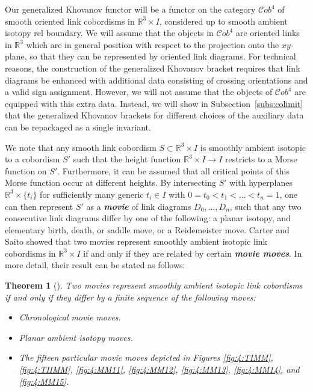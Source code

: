 \documentclass[12pt]{amsart}
\theoremstyle{definition}
\theoremstyle{plain}
\newtheorem{theorem}{Theorem}
\newcommand{\defw}[1]{{\bf{\textit{#1}}}}
\newcommand{\cobIV}{\mathcal{C}ob^4}
\begin{document}
Our generalized Khovanov functor will be a functor on the category $\cobIV$ of smooth
oriented link cobordisms in $\mathbb{R}^3\times I$, considered up to smooth ambient isotopy rel boundary. 
We will assume that the objects in $\cobIV$ are oriented links in $\mathbb{R}^3$ which are in general position
with respect to the projection onto the $xy$-plane, so that they can
be represented by oriented link diagrams. For technical reasons,
the construction of the generalized Khovanov bracket requires that link diagrams be enhanced
with additional data consisting of crossing orientations and a valid sign assignment. However,
we will not assume that the objects of
$\cobIV$ are equipped with this extra data. Instead, we will show in Subsection~\ref{subs:colimit}
that the generalized Khovanov brackets for different choices of the auxiliary data
can be repackaged as a single invariant.

We note that any smooth link cobordism $S\subset\mathbb{R}^3\times I$ is smoothly
ambient isotopic to a cobordism $S'$ such that the height function $\mathbb{R}^3\times I\rightarrow I$
restricts to a Morse function on $S'$. Furthermore, it can be assumed that all critical
points of this Morse function occur at different heights. By intersecting $S'$
with hyperplanes $\mathbb{R}^3\times\{t_i\}$ for sufficiently many generic $t_i\in I$ with $0=t_0<t_1<\ldots<t_n=1$,
one can then represent $S'$ as a \defw{movie} of link diagrams $D_0,\ldots,D_n$, such that any two
consecutive link diagrams differ by one of the following: a planar isotopy, and elementary birth, death, or saddle move,
or a Reidemeister move.
Carter and Saito \cite{CS1991,CS1993} showed that two movies represent smoothly ambient
isotopic link cobordisms in $\mathbb{R}^3\times I$ if and only if they are related by certain \defw{movie moves}. In more detail,
their result can be stated as follows:

\begin{theorem}[\cite{CS1993}]\label{thm:CS}
	Two movies represent smoothly ambient isotopic link cobordisms if and only if they differ by a finite sequence of 
	the following moves:
\begin{itemize}
\item Chronological movie moves.
\item Planar ambient isotopy moves.
\item The fifteen particular movie moves
depicted in Figures \ref{fig:4:TIMM}, \ref{fig:4:TIIMM}, \ref{fig:4:MM11}, \ref{fig:4:MM12}, \ref{fig:4:MM13}, \ref{fig:4:MM14}, and \ref{fig:4:MM15}.
\end{itemize}
\end{theorem}
\end{document}
